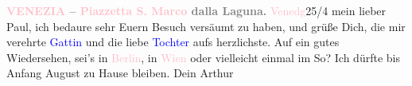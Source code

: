            \noindent{}\centering{}{\pb}\textcolor{gray}{\textbf{\textcolor{pink}{VENEZIA}{}\ledrightnote{\textcolor{pink}{Venedig}} – \textcolor{pink}{Piazzetta S. Marco}{}\ledrightnote{\textcolor{pink}{San Marco}} dalla
                     Laguna.}}\pend
           \pstart
           \raggedleft{}{\pb}\textcolor{pink}{Venedg}{}\ledrightnote{\textcolor{pink}{Venedig}}{ }25/4\pend
           \pstart
           mein lieber Paul, ich bedaure sehr Euern Besuch versäumt zu haben,
               und grüße Dich, die mir verehrte \textcolor{blue}{Gattin}{} und die liebe \textcolor{blue}{Tochter}{} aufs herzlichste.\pend
           \pstart
           Auf ein gutes Wiedersehen, sei’s in \textcolor{pink}{Berlin}{}\ledrightnote{\textcolor{pink}{Berlin}}, in
                  \textcolor{pink}{Wien}{}\ledrightnote{\textcolor{pink}{Wien}} oder vielleicht einmal im So\damage{\textcolor{gray}{mmer}}?\pend
           \pstart
           Ich dürfte bis Anfang August zu Hause bleiben.\pend
           \pstart Dein \spacefill\mbox{Arthur}\pend{}\endnumbering{}\begin{anhang}\end{anhang}
      